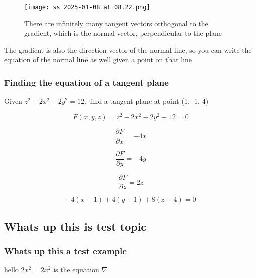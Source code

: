 \documentclass{article}
\begin{document}
\begin{figure}[h]
\caption{There are infinitely many tangent vectors orthogonal to the gradient, which is the normal vector, perpendicular to the plane}
\centering
\texttt{[image: ss 2025-01-08 at 08.22.png]}
\end{figure}
The gradient is also the direction vector of the normal line, so you can write the equation of the normal line as well given a point on that line\\

\subsubsection{Finding the equation of a tangent plane}
Given $z^2 - 2x^2 - 2y^2 = 12,$ find a tangent plane at point (1, -1, 4)

\begin{equation}
F(x, y, z) = z^2 - 2x^2 - 2y^2 - 12 = 0
\end{equation}

\begin{equation}
\frac{\partial F}{\partial x} = -4x
\end{equation}

\begin{equation}
\frac{\partial F}{\partial y} = -4y
\end{equation}

\begin{equation}
\frac{\partial F}{\partial z} = 2z
\end{equation}

\begin{equation}
-4(x-1) + 4(y+1) +8(z-4) = 0
\end{equation}

\subsection{Whats up this is test topic}

\subsubsection{    Whats up this a test example}
hello $2x^2 = 2x^2$ is the equation $\nabla$
\end{document}

